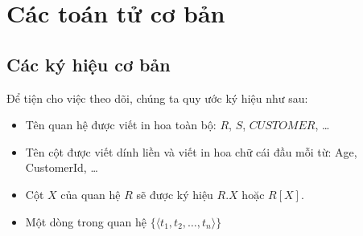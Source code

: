 \documentclass[11pt, handout]{beamer}
\begin{document}
  \section{Các toán tử cơ bản}
  \subsection{Các ký hiệu cơ bản}
  \begin{frame}
    Để tiện cho việc theo dõi, chúng ta quy ước ký hiệu như sau:
    \begin{itemize}
      \item Tên quan hệ được viết in hoa toàn bộ: $R$, $S$, $CUSTOMER$, \dots 
      \item Tên cột được viết dính liền và viết in hoa chữ cái đầu mỗi từ: Age, CustomerId, \dots
      \item Cột $X$ của quan hệ $R$ sẽ được ký hiệu $R.X$ hoặc $R[X]$.
      \item Một dòng trong quan hệ $\{\langle t_1, t_2, \dots, t_n\rangle\}$
    \end{itemize}
  \end{frame}
\end{document}
